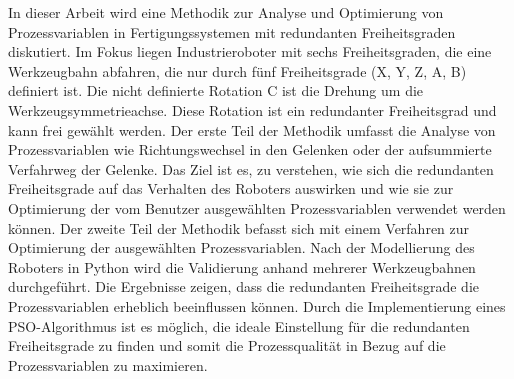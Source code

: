 {%
	In dieser Arbeit wird eine Methodik zur Analyse und Optimierung von Prozessvariablen in Fertigungssystemen mit redundanten Freiheitsgraden diskutiert.  Im Fokus liegen Industrieroboter mit sechs Freiheitsgraden, die eine Werkzeugbahn abfahren, die nur durch fünf Freiheitsgrade (X, Y, Z, A, B) definiert ist. Die nicht definierte Rotation C ist die Drehung um die Werkzeugsymmetrieachse. Diese Rotation ist ein redundanter Freiheitsgrad und kann frei gewählt werden.	 Der erste Teil der Methodik umfasst die Analyse von Prozessvariablen wie Richtungswechsel in den Gelenken oder der aufsummierte Verfahrweg der Gelenke. Das Ziel ist es, zu verstehen, wie sich die redundanten Freiheitsgrade auf das Verhalten des Roboters auswirken und wie sie zur Optimierung der vom Benutzer ausgewählten Prozessvariablen verwendet werden können. Der zweite Teil der Methodik befasst sich mit einem Verfahren zur Optimierung der ausgewählten Prozessvariablen. Nach der Modellierung des Roboters in Python wird die Validierung anhand mehrerer Werkzeugbahnen durchgeführt. Die Ergebnisse zeigen, dass die redundanten Freiheitsgrade die Prozessvariablen erheblich beeinflussen können. Durch die Implementierung eines \acrshort{PSO}-Algorithmus ist es möglich, die ideale Einstellung für die redundanten Freiheitsgrade zu finden und somit die Prozessqualität in Bezug auf die Prozessvariablen zu maximieren.
	
	
}%
%
%
